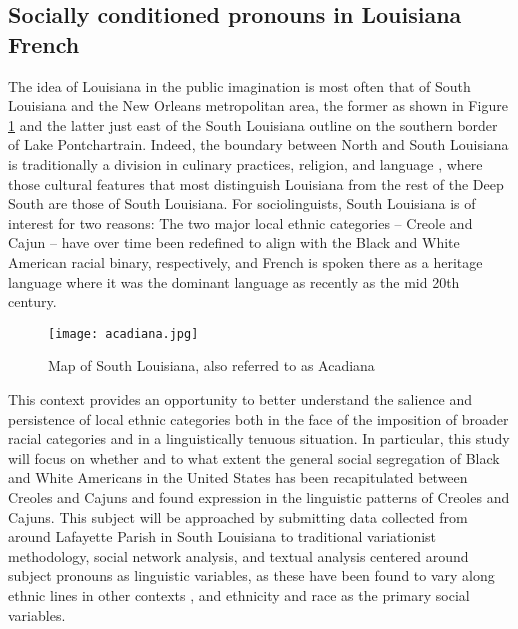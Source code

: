     \subsection{Socially conditioned pronouns in Louisiana French}




  The idea of Louisiana in the public imagination is most often that of South Louisiana and the New Orleans metropolitan area, the former as shown in Figure \ref{fig:south_la} and the latter just east of the South Louisiana outline on the southern border of Lake Pontchartrain.
  Indeed, the boundary between North and South Louisiana is traditionally a division in culinary practices, religion, and language \parencite[p.~309]{trepanier_french_1988}, where those cultural features that most distinguish Louisiana from the rest of the Deep South are those of South Louisiana.
  For sociolinguists, South Louisiana is of interest for two reasons: The two major local ethnic categories -- Creole and Cajun -- have over time been redefined to align with the Black and White American racial binary, respectively, and French is spoken there as a heritage language where it was the dominant language as recently as the mid 20th century.

  \begin{figure}[tbhp]
    \centering
    \caption{Map of South Louisiana, also referred to as Acadiana}
    \label{fig:south_la}
    \texttt{[image: acadiana.jpg]}
  \end{figure}

  This context provides an opportunity to better understand the salience and persistence of local ethnic categories both in the face of the imposition of broader racial categories and in a linguistically tenuous situation.
  In particular, this study will focus on whether and to what extent the general social segregation of Black and White Americans in the United States \parencite{smith_social_2014} has been recapitulated between Creoles and Cajuns and found expression in the linguistic patterns of Creoles and Cajuns.
  This subject will be approached by submitting data collected from around Lafayette Parish in South Louisiana to traditional variationist methodology, social network analysis, and textual analysis centered around subject pronouns as linguistic variables, as these have been found to vary along ethnic lines in other contexts \parencite{dajko_ethnic_2009, rottet_language_1995}, and ethnicity and race as the primary social variables.

